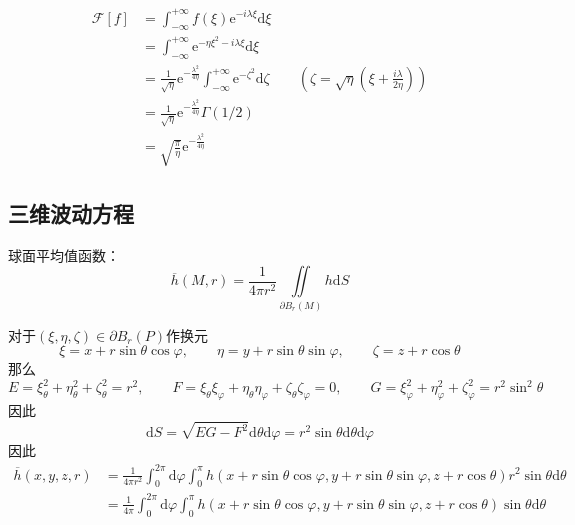 \documentclass[lang = cn, scheme = chinese, thmcnt = section]{elegantbook}
\newcommand{\dd}{\mathrm{d}}           %
\newcommand{\IInt}{\iint\limits}
\begin{document}
\begin{solution}
	\begin{align*}
		\mathscr{F}[f]
		& = \int_{-\infty}^{+\infty}f(\xi)\text{e}^{-i\lambda\xi}\dd\xi\\
		& = \int_{-\infty}^{+\infty}\text{e}^{-\eta \xi^2-i\lambda\xi}\dd\xi\\
		& = \frac{1}{\sqrt{\eta}}\text{e}^{-\frac{\lambda^2}{4\eta}}\int_{-\infty}^{+\infty}\text{e}^{-\zeta^2}\dd\zeta\qquad \left(\zeta=\sqrt{\eta}\left(\xi+\frac{i\lambda}{2\eta}\right)\right)\\
		& = \frac{1}{\sqrt{\eta}}\text{e}^{-\frac{\lambda^2}{4\eta}}\Gamma(1/2)\\
		& = \sqrt{\frac{\pi}{\eta}}\text{e}^{-\frac{\lambda^2}{4\eta}}
	\end{align*}
\end{solution}

\subsection{三维波动方程}

\begin{note}
	球面平均值函数：
	$$
	\overline{h}(M,r)=\frac{1}{4\pi r^2}\IInt_{\partial B_r(M)}h\dd S
	$$
	
	对于$(\xi,\eta,\zeta)\in \partial B_r(P)$作换元%
	$$
	\xi=x+r\sin\theta\cos\varphi,\qquad
	\eta=y+r\sin\theta\sin\varphi,\qquad
	\zeta=z+r\cos\theta
	$$
	那么%
	$$
	E=\xi_\theta^2+\eta_\theta^2+\zeta_\theta^2=r^2,\qquad
	F=\xi_\theta\xi_\varphi+\eta_\theta\eta_\varphi+\zeta_\theta\zeta_\varphi=0,\qquad
	G=\xi_\varphi^2+\eta_\varphi^2+\zeta_\varphi^2=r^2\sin^2\theta
	$$
	因此%
	$$
	\dd S=\sqrt{EG-F^2}\dd\theta\dd\varphi
	=r^2\sin\theta\dd\theta\dd\varphi
	$$
	因此%
	\begin{align*}
		\overline{h}(x,y,z,r)
		& = \frac{1}{4\pi r^2}\int_{0}^{2\pi}\dd\varphi\int_{0}^{\pi}
		h(x+r\sin\theta\cos\varphi,y+r\sin\theta\sin\varphi,z+r\cos\theta)r^2\sin\theta\dd\theta\\
		& = \frac{1}{4\pi}\int_{0}^{2\pi}\dd\varphi\int_{0}^{\pi}
		h(x+r\sin\theta\cos\varphi,y+r\sin\theta\sin\varphi,z+r\cos\theta)\sin\theta\dd\theta
	\end{align*}
\end{note}
\end{document}
